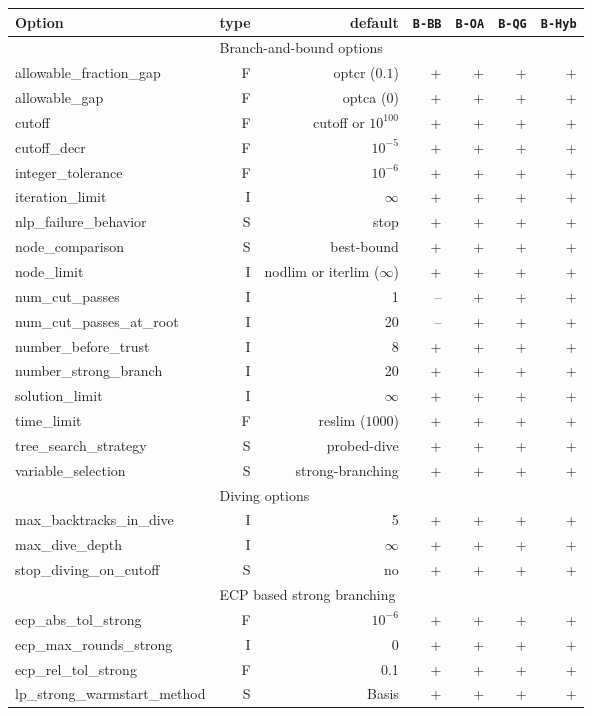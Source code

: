 \begin{center}
\begin{tabular}{|l|r|r|r|r|r|r|}\hline
Option & type &  default & {\tt B-BB} & {\tt B-OA} & {\tt B-QG} & {\tt B-Hyb} \\
\hline
\hline
\multicolumn{1}{|c}{} & \multicolumn{6}{l|}{Branch-and-bound options}\\
\hline
allowable\_fraction\_gap& F& optcr ($0.1$)& +& +& +& +\\
allowable\_gap& F& optca ($0$)& +& +& +& +\\
cutoff& F& cutoff or $10^{100}$& +& +& +& +\\
cutoff\_decr& F& $10^{-5}$& +& +& +& +\\
integer\_tolerance& F& $10^{-6}$& +& +& +& +\\
iteration\_limit& I& $\infty$& +& +& +& +\\
nlp\_failure\_behavior& S& stop& +& +& +& +\\
node\_comparison& S& best-bound& +& +& +& +\\
node\_limit& I& nodlim or iterlim ($\infty$)& +& +& +& +\\
num\_cut\_passes& I& 1&--& +& +& +\\
num\_cut\_passes\_at\_root& I& 20&--& +& +& +\\
number\_before\_trust& I& 8& +& +& +& +\\
number\_strong\_branch& I& 20& +& +& +& +\\
solution\_limit& I& $\infty$& +& +& +& +\\
time\_limit& F& reslim ($1000$)& +& +& +& +\\
tree\_search\_strategy& S& probed-dive& +& +& +& +\\
variable\_selection& S& strong-branching& +& +& +& +\\
\hline
\multicolumn{1}{|c}{} & \multicolumn{6}{l|}{Diving options}\\
\hline
max\_backtracks\_in\_dive& I& 5& +& +& +& +\\
max\_dive\_depth& I& $\infty$& +& +& +& +\\
stop\_diving\_on\_cutoff& S& no& +& +& +& +\\
\hline
\multicolumn{1}{|c}{} & \multicolumn{6}{l|}{ECP based strong branching}\\
\hline
ecp\_abs\_tol\_strong& F& $10^{-6}$& +& +& +& +\\
ecp\_max\_rounds\_strong& I& 0& +& +& +& +\\
ecp\_rel\_tol\_strong& F& 0.1& +& +& +& +\\
lp\_strong\_warmstart\_method& S& Basis& +& +& +& +\\

\end{tabular}
\end{center}
